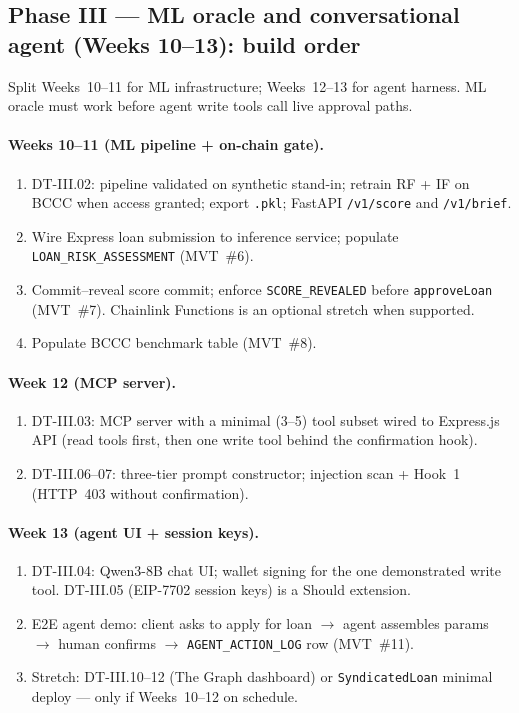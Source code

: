 \documentclass[12pt,a4paper]{report}
\begin{document}
\subsection{Phase III --- ML oracle and conversational agent (Weeks 10--13): build order}

Split Weeks~10--11 for ML infrastructure; Weeks~12--13 for agent harness. ML oracle must work before agent write tools call live approval paths.

\paragraph{Weeks 10--11 (ML pipeline + on-chain gate).}
\begin{enumerate}[noitemsep]
\item DT-III.02: pipeline validated on synthetic stand-in; retrain RF + IF on BCCC when access granted; export \texttt{.pkl}; FastAPI \texttt{/v1/score} and \texttt{/v1/brief}.
\item Wire Express loan submission to inference service; populate \texttt{LOAN\_RISK\_ASSESSMENT} (MVT~\#6).
\item Commit--reveal score commit; enforce \texttt{SCORE\_REVEALED} before \texttt{approveLoan} (MVT~\#7). Chainlink Functions is an optional stretch when supported.
\item Populate BCCC benchmark table (MVT~\#8).
\end{enumerate}

\paragraph{Week 12 (MCP server).}
\begin{enumerate}[noitemsep]
\item DT-III.03: MCP server with a minimal (3--5) tool subset wired to Express.js API (read tools first, then one write tool behind the confirmation hook).
\item DT-III.06--07: three-tier prompt constructor; injection scan + Hook~1 (HTTP~403 without confirmation).
\end{enumerate}

\paragraph{Week 13 (agent UI + session keys).}
\begin{enumerate}[noitemsep]
\item DT-III.04: Qwen3-8B chat UI; wallet signing for the one demonstrated write tool. DT-III.05 (EIP-7702 session keys) is a Should extension.
\item E2E agent demo: client asks to apply for loan $\to$ agent assembles params $\to$ human confirms $\to$ \texttt{AGENT\_ACTION\_LOG} row (MVT~\#11).
\item Stretch: DT-III.10--12 (The Graph dashboard) or \texttt{SyndicatedLoan} minimal deploy --- only if Weeks~10--12 on schedule.
\end{enumerate}
\end{document}
